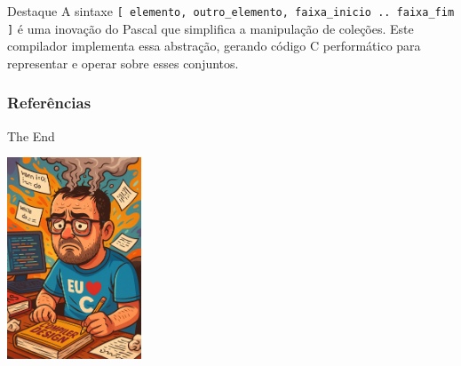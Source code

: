 \documentclass[
	11pt,
	aspectratio=169,
]{beamer}
\begin{document}
          \begin{frame}
            \begin{exampleblock}{Destaque}
          A sintaxe \texttt{[ elemento, outro\_elemento, faixa\_inicio .. faixa\_fim ]} é uma inovação do Pascal que simplifica a manipulação de coleções.
        Este compilador implementa essa abstração, gerando código C performático para representar e operar sobre esses conjuntos.
    \end{exampleblock}
          \end{frame}

\begin{frame}[allowframebreaks]
	\frametitle{Referências}
	
	\begin{thebibliography}{99}
		\footnotesize
		
    	\printbibliography
    
	\end{thebibliography}
\end{frame}

\begin{frame}[plain]
	{\Huge The End}
  \begin{center}
  \includegraphics[width=0.3\textwidth]{dev.png}
  \end{center}
\end{frame}
\end{document}
